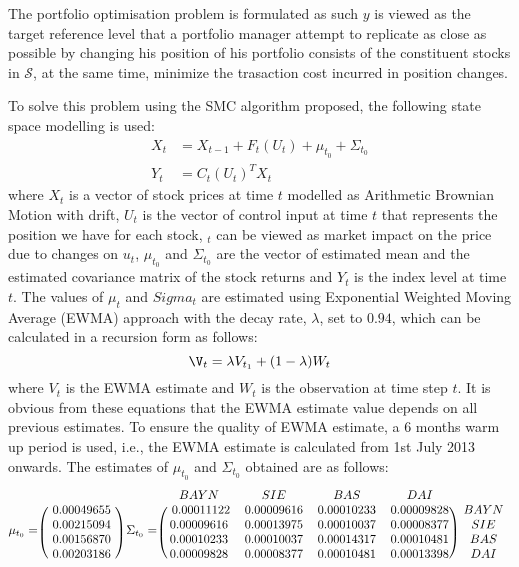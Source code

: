 The portfolio optimisation problem is formulated as such $y$ is viewed as the target reference level that a portfolio manager attempt to replicate as close as possible by changing his position of his portfolio consists of the constituent stocks in $\mathcal{S}$, at the same time, minimize the trasaction cost incurred in position changes.

To solve this problem using the SMC algorithm proposed,  the following state space modelling is used:
\begin{align}
  X_t &= X_{t-1} + F_t(U_t) + \mu_{t_0} + \Sigma_{t_0} \\
  Y_t &= C_t(U_t)^{T}X_t
\end{align}
where $X_t$ is a vector of stock prices at time $t$ modelled as Arithmetic Brownian Motion with drift, $U_t$ is the vector of control input at time $t$ that represents the position we have for each stock, $_t$ can be viewed as market impact on the price due to changes on $u_t$, $\mu_{t_0}$ and $\Sigma_{t_0}$ are the vector of estimated mean and the estimated covariance matrix of the stock returns and $Y_t$ is the index level at time $t$. The values of $\mu_t$ and $Sigma_t$ are estimated using Exponential Weighted Moving Average (EWMA) approach with the decay rate, $\lambda$, set to $0.94$, which can be calculated in a recursion form as follows:
\begin{equation}
  \V_t = \lambda V_{t_1} + (1-\lambda) W_{t}
\end{equation}
where $V_t$ is the EWMA estimate and $W_t$ is the observation at time step $t$. It is obvious from these equations that the EWMA estimate value depends on all previous estimates. To ensure the quality of EWMA estimate, a 6 months warm up period is used, i.e., the EWMA estimate is calculated from 1st July 2013 onwards. The estimates of $\mu_{t_0}$ and $\Sigma_{t_0}$ obtained are as follows:
\begin{equation}
\mu_{t_0} = 
\begin{blockarray}{c}
 \\
\begin{block}{(c)}
 ~ 0.00049655 ~ \\
 0.00215094 \\
 0.00156870 \\
 0.00203186 \\
\end{block}
\end{blockarray}
~\Sigma_{t_0} = 
\begin{blockarray}{ccccc}
  BAYN & SIE & BAS & DAI & \\
\begin{block}{(cccc)c} 
 ~ 0.00011122 & 0.00009616 & 0.00010233 & 0.00009828 ~ & BAYN \\
0.00009616 & 0.00013975 & 0.00010037 & 0.00008377 ~ & SIE \\
0.00010233 & 0.00010037 & 0.00014317 & 0.00010481 & BAS \\
0.00009828 & 0.00008377 & 0.00010481 & 0.00013398 & DAI \\
\end{block}
\end{blockarray}
\end{equation}

